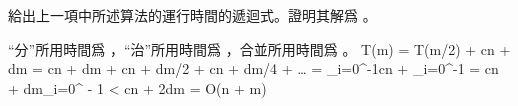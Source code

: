 \item 給出上一項中所述算法的運行時間的遞迴式。證明其解爲 。

\startANSWER
“分”所用時間爲 ，“治”所用時間爲 ，合並所用時間爲 。
\startformula\startmathalignment
\NC T(m) \NC= T(m/2) + cn + dm \NR
\NC      \NC= cn + dm + cn + dm/2 + cn + dm/4 + \ldots \NR
\NC      \NC= \sum_{i=0}^{-1}cn + \sum_{i=0}^{-1} \NR
\NC      \NC= cn + dm\sum_{i=0}^{ - 1} \NR
\NC      \NC< cn + 2dm \NR
\NC      \NC= O(n + m) \NR
\stopmathalignment\stopformula
\stopANSWER

\stopigBase
\stopPROBLEM

\stopsubject
